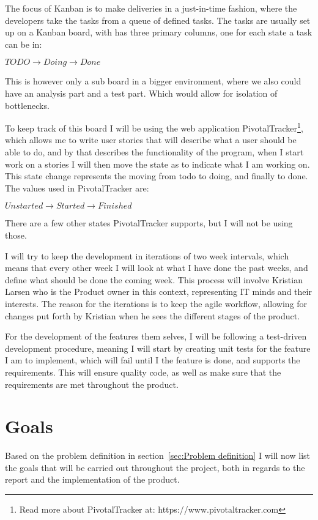 The focus of Kanban is to make deliveries in a just-in-time fashion, where the
developers take the tasks from a queue of defined tasks. The tasks are usually
set up on a Kanban board, with has three primary columns, one for each state a
task can be in: 

\begin{center}
  $TODO \rightarrow Doing \rightarrow Done$
\end{center}

This is however only a sub board in a bigger environment, where we also could
have an analysis part and a test part. Which would allow for isolation of
bottlenecks\cite{kanban}. 

To keep track of this board I will be using the web application
PivotalTracker\footnote{Read more about PivotalTracker at:
  https://www.pivotaltracker.com}, which allows me to write user stories that
will describe what a user should be able to do, and by that describes the
functionality of the program, when I start work on a stories I will then move
the state as to indicate what I am working on. This state change represents the
moving from todo to doing, and finally to done. The values used in
PivotalTracker are: 

\begin{center}
  $Unstarted \rightarrow Started \rightarrow Finished$
\end{center}

There are a few other states PivotalTracker supports, but I will not be using
those. 

I will try to keep the development in iterations of two week intervals, which
means that every other week I will look at what I have done the past weeks, and define
what should be done the coming week. This process will involve Kristian Larsen
who is the Product owner in this context, representing IT minds and their
interests. The reason for the iterations is to keep the agile workflow, allowing
for changes put forth by Kristian when he sees the different stages of the
product. 

For the development of the features them selves, I will be following a
test-driven development procedure, meaning I will start by creating unit tests
for the feature I am to implement, which will fail until I the feature is done,
and supports the requirements. This will ensure quality code, as well as make
sure that the requirements are met throughout the product. 

\section{Goals}
\label{sec:Goals}
Based on the problem definition in section~\ref{sec:Problem definition} I will
now list the goals that will be carried out throughout the project, both in
regards to the report and the implementation of the product. 

